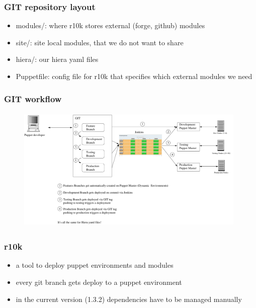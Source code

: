\documentclass{beamer}
\begin{document}
\begin{frame}
  \frametitle{GIT repository layout}

  \begin{itemize}
  \item modules/: where r10k stores external (forge, github) modules
  \item site/: site local modules, that we do not want to share
  \item hiera/: our hiera yaml files
  \item Puppetfile: config file for r10k that specifies which external modules we need
  \end{itemize}
\end{frame}


\begin{frame}
  \frametitle{GIT workflow}
  \begin{figure}
    \centering
      \includegraphics[height=6cm,width=11cm]{../pics/puppet_deployment2}
    \label{fig:stack}
  \end{figure}

\end{frame}

\begin{frame}
  \frametitle{r10k}

  \begin{itemize}
  \item a tool to deploy puppet environments and modules
  \item every git branch gets deploy to a puppet environment
  \item in the current version (1.3.2) dependencies have to be managed
    manually
  \end{itemize}

\end{frame}
\end{document}
